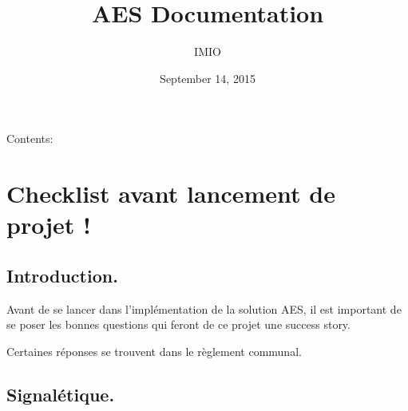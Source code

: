 \documentclass[letterpaper,10pt,english]{sphinxmanual}
\title{AES Documentation}
\date{September 14, 2015}
\author{IMIO}
\begin{document}
\maketitle
\tableofcontents
{}\label{index::doc}


Contents:


\chapter{Checklist avant lancement de projet !}
\label{checklist:checklist-avant-lancement-de-projet}\label{checklist::doc}\label{checklist:welcome-to-aes-s-documentation}

\section{Introduction.}
\label{checklist:introduction}
Avant de se lancer dans l'implémentation de la solution AES, il est important de se poser les bonnes questions qui feront de ce projet une success story.

Certaines réponses se trouvent dans le règlement communal.


\section{Signalétique.}
\label{checklist:signaletique}
\end{document}
